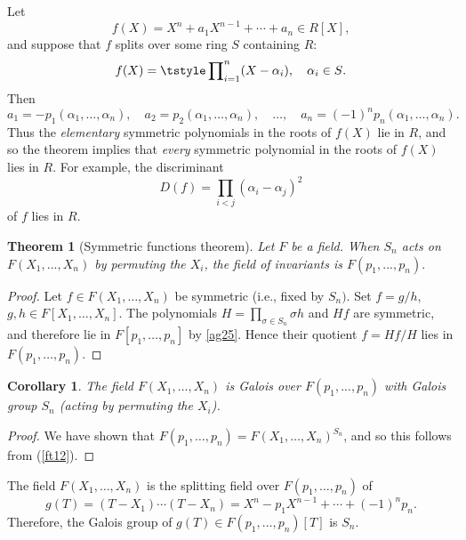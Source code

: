\documentclass[a4paper,11pt,final,openany]{memoir}
\newtheorem{corollary}[X]{Corollary}
\newtheorem{theorem}[X]{Theorem}
\theoremstyle{nonumberplain}
\newtheorem{proof}{Proof.}
\begin{document}
Let
\[
f(X)=X^{n}+a_{1}X^{n-1}+\cdots+a_{n}\in R[X],
\]
and suppose that $f$ splits over some ring $S$ containing $R$:
\[
f(X)=\tstyle\prod\nolimits_{i=1}^{n}(X-\alpha_{i}),\quad\alpha_{i}\in
S\text{.}%
\]
Then
\[
a_{1}=-p_{1}(\alpha_{1},\ldots,\alpha_{n}),\quad a_{2}=p_{2}(\alpha_{1}%
,\ldots,\alpha_{n}),\quad\ldots,\quad a_{n}=(-1)^{n}p_{n}(\alpha_{1}%
,\ldots,\alpha_{n}).
\]
Thus the \textit{elementary}\emph{\/} symmetric polynomials in the roots of
$f(X)$ lie in $R$, and so the theorem implies that \textit{every}\emph{\/}
symmetric polynomial in the roots of $f(X)$ lies in $R$. For example, the
discriminant
\[
D(f)=\prod_{i<j}(\alpha_{i}-\alpha_{j})^{2}%
\]
of $f$ lies in $R$.

\begin{theorem}
[Symmetric functions theorem]\label{ag26}Let $F$ be a field. When $S_{n}$ acts
on $F(X_{1},...,X_{n})$ by permuting the $X_{i}$, the field of invariants is
$F(p_{1},...,p_{n}).$
\end{theorem}

\begin{proof}
Let $f\in F(X_{1},\ldots,X_{n})$ be symmetric (i.e., fixed by $S_{n})$. Set
$f=g/h$, $g,h\in F[X_{1},\ldots,X_{n}]$. The polynomials $H=\prod_{\sigma\in
S_{n}}\sigma h$ and $Hf$ are symmetric, and therefore lie in $F[p_{1}%
,\ldots,p_{n}]$ by \ref{ag25}. Hence their quotient $f=Hf/H$ lies in
$F(p_{1},\ldots,p_{n})$.
\end{proof}

\begin{corollary}
\label{ag27}The field $F(X_{1},...,X_{n})$ is Galois over $F(p_{1},...,p_{n})$
with Galois group $S_{n}$ (acting by permuting the $X_{i}$).
\end{corollary}

\begin{proof}
We have shown that $F(p_{1},\ldots,p_{n})=F(X_{1},\ldots,X_{n})^{S_{n}}$, and
so this follows from (\ref{ft12}).
\end{proof}

The field $F(X_{1},\ldots,X_{n})$ is the splitting field over $F(p_{1}%
,\ldots,p_{n})$ of%
\[
g(T)=(T-X_{1})\cdots(T-X_{n})=X^{n}-p_{1}X^{n-1}+\cdots+(-1)^{n}p_{n}.
\]
Therefore, the Galois group of $g(T)\in F(p_{1},\ldots,p_{n})[T]$ is $S_{n}$.
\end{document}
